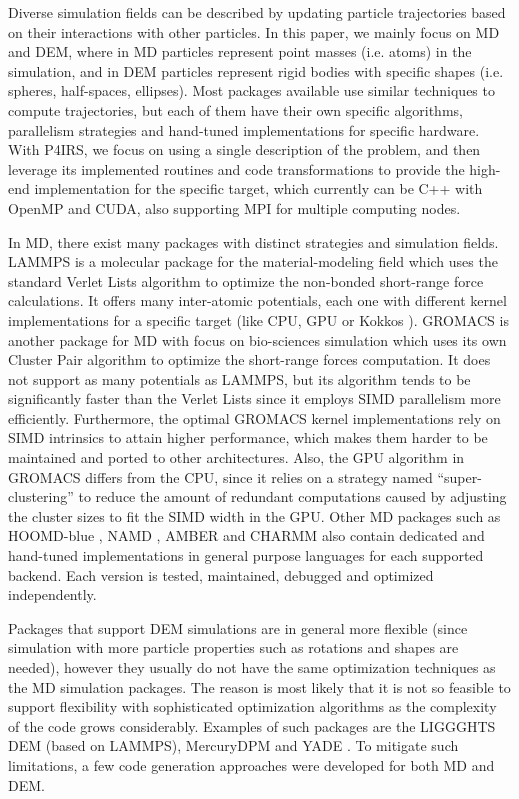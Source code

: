 \documentclass[preprint,12pt]{elsarticle}
\begin{document}
Diverse simulation fields can be described by updating particle trajectories based on their interactions with other particles.
In this paper, we mainly focus on \ac{MD} and \ac{DEM}, where in MD particles represent point masses (i.e. atoms) in the simulation, and in \ac{DEM} particles represent rigid bodies with specific shapes (i.e. spheres, half-spaces, ellipses).
Most packages available use similar techniques to compute trajectories, but each of them have their own specific algorithms, parallelism strategies and hand-tuned implementations for specific hardware.
With P4IRS, we focus on using a single description of the problem, and then leverage its implemented routines and code transformations to provide the high-end implementation for the specific target, which currently can be C++ with OpenMP and CUDA, also supporting MPI for multiple computing nodes.

In MD, there exist many packages with distinct strategies and simulation fields.
LAMMPS \cite{lammps1,lammps2} is a molecular package for the material-modeling field which uses the standard Verlet Lists algorithm to optimize the non-bonded short-range force calculations.
It offers many inter-atomic potentials, each one with different kernel implementations for a specific target (like CPU, GPU or Kokkos \cite{kokkos}).
GROMACS \cite{gromacs1,gromacs2} is another package for MD with focus on bio-sciences simulation which uses its own Cluster Pair algorithm to optimize the short-range forces computation.
It does not support as many potentials as LAMMPS, but its algorithm tends to be significantly faster than the Verlet Lists since it employs SIMD parallelism more efficiently.
Furthermore, the optimal GROMACS kernel implementations rely on SIMD intrinsics to attain higher performance, which makes them harder to be maintained and ported to other architectures.
Also, the GPU algorithm in GROMACS differs from the CPU, since it relies on a strategy named ``super-clustering'' to reduce the amount of redundant computations caused by adjusting the cluster sizes to fit the SIMD width in the GPU.
Other MD packages such as HOOMD-blue \cite{hoomdblue}, NAMD \cite{namd}, AMBER \cite{amber1,amber2} and CHARMM \cite{charmm} also contain dedicated and hand-tuned implementations in general purpose languages for each supported backend.
Each version is tested, maintained, debugged and optimized independently.

Packages that support DEM simulations are in general more flexible (since simulation with more particle properties such as rotations and shapes are needed), however they usually do not have the same optimization techniques as the MD simulation packages.
The reason is most likely that it is not so feasible to support flexibility with sophisticated optimization algorithms as the complexity of the code grows considerably.
Examples of such packages are the LIGGGHTS DEM \cite{liggghts} (based on LAMMPS), MercuryDPM \cite{mercurydpm} and YADE \cite{yade}.
To mitigate such limitations, a few code generation approaches were developed for both MD and DEM.
\end{document}
